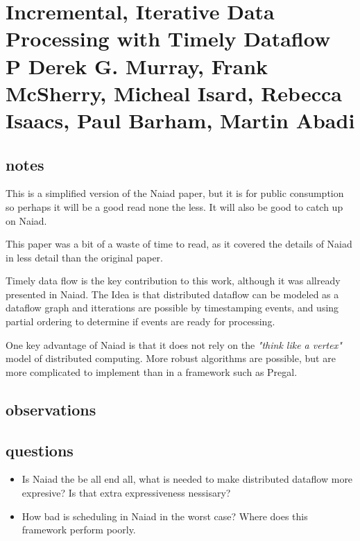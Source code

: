 \section{Incremental, Iterative Data Processing with Timely Dataflow \\ \small{ P Derek G. Murray, Frank McSherry, Micheal Isard, Rebecca Isaacs, Paul Barham, Martin Abadi}}

\subsection{notes}

This is a simplified version of the Naiad paper, but it is for public
consumption so perhaps it will be a good read none the less. It will also be
good to catch up on Naiad.

This paper was a bit of a waste of time to read, as it covered the details of
Naiad in less detail than the original paper.

Timely data flow is the key contribution to this work, although it was allready
presented in Naiad. The Idea is that distributed dataflow can be modeled as a
dataflow graph and itterations are possible by timestamping events, and using
partial ordering to determine if events are ready for processing.

One key advantage of Naiad is that it does not rely on the \textit{"think like
a vertex"} model of distributed computing. More robust algorithms are possible,
but are more complicated to implement than in a framework such as Pregal.

\subsection{observations}

\subsection{questions}

\begin{itemize}

\item Is Naiad the be all end all, what is needed to make distributed dataflow
more expresive? Is that extra expressiveness nessisary?

\item How bad is scheduling in Naiad in the worst case? Where does this
framework perform poorly.


\end{itemize}




